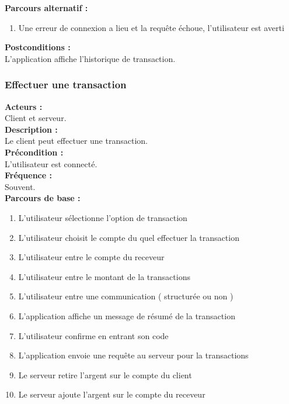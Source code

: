 \documentclass[../rapport.tex]{subfiles}
\begin{document}
\textbf{Parcours alternatif :}
\begin{enumerate}
    \item Une erreur de connexion a lieu et la requête échoue, l’utilisateur est averti
\end{enumerate}

\textbf{Postconditions :} \\
L’application affiche l’historique de transaction. \\



\subsubsection{Effectuer une transaction}

\textbf{Acteurs :} \\
Client et serveur. \\

\textbf{Description :} \\
Le client peut effectuer une transaction. \\

\textbf{Précondition :} \\
L'utilisateur est connecté. \\

\textbf{Fréquence :} \\
Souvent. \\

\textbf{Parcours de base :} \\
\begin{enumerate}
    \item L’utilisateur sélectionne l’option de transaction
    \item L’utilisateur choisit le compte du quel effectuer la transaction
    \item L’utilisateur entre le compte du receveur
    \item L’utilisateur entre le montant de la transactions
    \item L’utilisateur entre une communication ( structurée ou non )
    \item L’application affiche un message de résumé de la transaction
    \item L’utilisateur confirme en entrant son code
    \item L’application envoie une requête au serveur pour la transactions
    \item Le serveur retire l’argent sur le compte du client
    \item Le serveur ajoute l’argent sur le compte du receveur
\end{enumerate}
\bigskip
\end{document}
